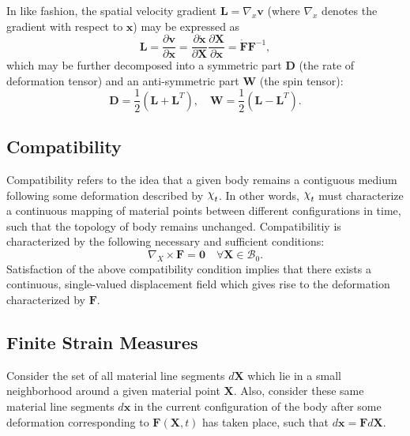 In like fashion, the spatial velocity gradient $\mathbf{L} = \nabla_x \mathbf{v}$ (where $\nabla_x$ denotes the gradient with respect to $\mathbf{x}$) may be expressed as
\begin{equation}
  \mathbf{L} = \frac{\partial \mathbf{v}}{\partial \mathbf{x}} = \frac{\partial \dot{\mathbf{x}}}{\partial \mathbf{X}} \frac{\partial \mathbf{X}}{\partial \mathbf{x}} = \dot{\mathbf{F}} \mathbf{F}^{-1},
\end{equation}
which may be further decomposed into a symmetric part $\mathbf{D}$ (the rate of deformation tensor) and an anti-symmetric part $\mathbf{W}$ (the spin tensor):
\begin{equation}
  \mathbf{D} = \frac{1}{2} (\mathbf{L} + \mathbf{L}^T), \quad \mathbf{W} = \frac{1}{2} (\mathbf{L} - \mathbf{L}^T).
\end{equation}

\subsection*{Compatibility}

Compatibility refers to the idea that a given body remains a contiguous medium following some deformation described by $\raisebox{\depth}{$\chi$}_t$. In other words, $\raisebox{\depth}{$\chi$}_t$ must characterize a continuous mapping of material points between different configurations in time, such that the topology of body remains unchanged. Compatibilitiy is characterized by the following necessary and sufficient conditions:
\begin{equation}
  \nabla_X \times \mathbf{F} = \mathbf{0} \quad \forall \mathbf{X} \in \mathcal{B}_0.
  \label{eq:compatibility}
\end{equation}
Satisfaction of the above compatibility condition implies that there exists a continuous, single-valued displacement field which gives rise to the deformation characterized by $\mathbf{F}$.

\subsection*{Finite Strain Measures}

Consider the set of all material line segments $d \mathbf{X}$ which lie in a small neighborhood around a given material point $\mathbf{X}$. Also, consider these same material line segments $d \mathbf{x}$ in the current configuration of the body after some deformation corresponding to $\mathbf{F} (\mathbf{X}, t)$ has taken place, such that $d \mathbf{x} = \mathbf{F} d \mathbf{X}$.

